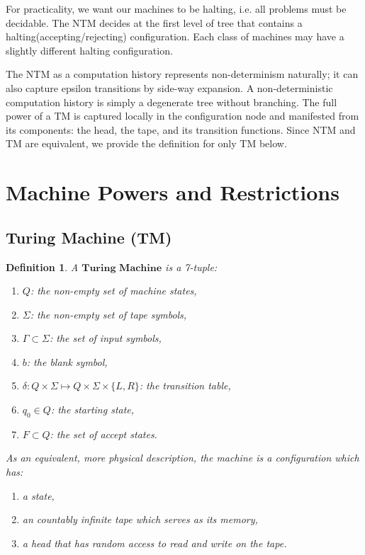\documentclass[12pt]{article}  %
\newtheorem{definition}{Definition}
\begin{document}
For practicality, we want our machines to be halting, i.e. all problems must be decidable. The NTM decides at the first level of tree that contains a halting(accepting/rejecting) configuration. Each class of machines may have a slightly different halting configuration.

The NTM as a computation history represents non-determinism naturally; it can also capture epsilon transitions by side-way expansion. A non-deterministic computation history is simply a degenerate tree without branching. The full power of a TM is captured locally in the configuration node and manifested from its components: the head, the tape, and its transition functions. Since NTM and TM are equivalent, we provide the definition for only TM below.




\section{Machine Powers and Restrictions}

\subsection{Turing Machine (TM)}

\begin{definition}
A $\textbf{Turing Machine}$ is a 7-tuple:
\begin{enumerate}
	\item $Q$: the non-empty set of machine states,
	\item $\Sigma$: the non-empty set of tape symbols,
	\item $\Gamma \subset \Sigma$: the set of input symbols,
	\item $b$: the blank symbol,
	\item $\delta: Q \times \Sigma \mapsto Q \times \Sigma \times \{L, R\} $: the transition table,
	\item $q_0 \in Q$: the starting state,
	\item $F \subset Q$: the set of accept states.
\end{enumerate}

As an equivalent, more physical description, the machine is a configuration which has:
\begin{enumerate}
	\item a state,
	\item an countably infinite tape which serves as its memory,
	\item a head that has random access to read and write on the tape.
\end{enumerate}
\end{definition}
\end{document}
